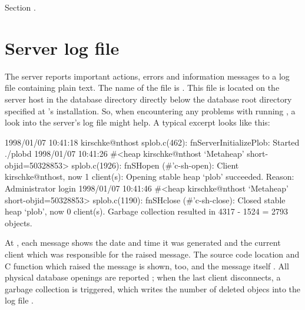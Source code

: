  Section .

\section{Server log file}

The server reports important actions, errors and information messages
to a log file containing plain text. The name of the file is
. This file is located on the server host in the
database directory directly below the database root directory
specified at \plobwoexcl's installation. So, when encountering any
problems with running \plob, a look into the server's log file might
help.  A typical excerpt looks like this:
\begin{CompactCode}
1998/01/07 10:41:18 kirschke@nthost\marginnumber{\smalloi}
       splob.c(462): fnServerInitializePlob:
       Started ./plobd\marginnumber{\smalloii}
1998/01/07 10:41:26 #<heap kirschke@nthost `Metaheap'
                                           short-objid=50328853>
       splob.c(1926): fnSHopen (#'c-sh-open):
       Client kirschke@nthost, now 1 client(s):\marginnumber{\smalloiii}
       Opening stable heap `plob' succeeded.
       Reason: Administrator login
1998/01/07 10:41:46 #<heap kirschke@nthost `Metaheap'
                                           short-objid=50328853>
       splob.c(1190): fnSHclose (#'c-sh-close):
       Closed stable heap `plob',\marginnumber{\smalloiv}
       now 0 client(s).
       Garbage collection resulted in 4317 - 1524 = 2793 objects.
\end{CompactCode}

At \oi, each message shows the date and time it was generated and the
current client which was responsible for the raised message. The
source code location and C function which raised the message is shown,
too, and the message itself \oii. All physical database
openings are reported \oiii; when the last client disconnects, a
garbage collection is triggered, which writes the number of deleted
objecs into the log file \oiv.



